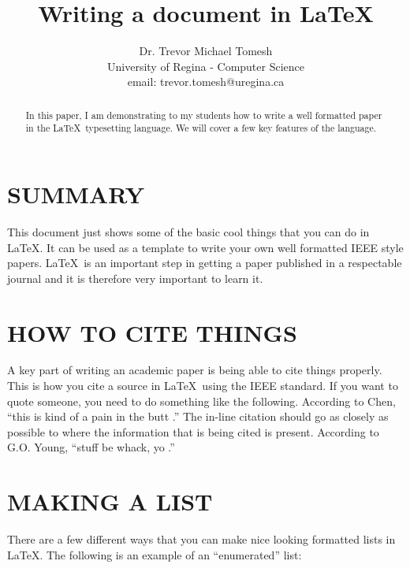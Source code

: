 \documentclass[letterpaper, 10 pt, conference]{ieeeconf}  %
\title{\LARGE \bf
Writing a document in \LaTeX
}
\author{Dr. Trevor Michael Tomesh\\
University of Regina - Computer Science\\
email: trevor.tomesh@uregina.ca
}
\begin{document}
\maketitle
\thispagestyle{empty}
\pagestyle{empty}


\begin{abstract}
In this paper, I am demonstrating to my students how to write a well 
formatted paper in the \LaTeX\ typesetting language. We will cover a few
key features of the language. 
\end{abstract}




\section{SUMMARY}
This document just shows some of the basic cool things that you can do in \LaTeX. 
It can be used as a template to write your own well formatted IEEE style papers. 
\LaTeX\ is an important step in getting a paper published in a respectable journal 
and it is therefore very important to learn it.


\section{HOW TO CITE THINGS}
A key part of writing an academic paper is being able to cite things properly. This is how you 
cite a source \cite{c1} in \LaTeX\ using the IEEE standard. If you want to quote someone, you need to do something like the following. According to Chen, ``this is kind of a pain in the butt \cite{c2}.'' The in-line citation should go as closely as possible to where the information that is being cited is present. According to G.O. Young, ``stuff be whack, yo \cite{c1}.''


\section{MAKING A LIST}

There are a few different ways that you can make nice looking formatted lists
in \LaTeX. The following is an example of an ``enumerated'' list:
\end{document}
